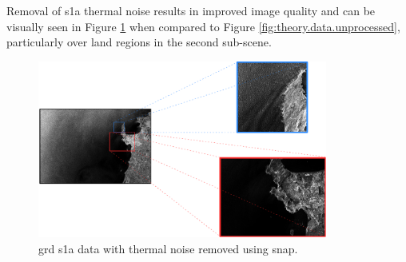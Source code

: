 

Removal of \acs{s1a} thermal noise results in improved image quality and can be visually seen in Figure \ref{fig:theory.data.thermalNoiseRemoval} when compared to Figure \ref{fig:theory.data.unprocessed}, particularly over land regions in the second sub-scene.

\begin{figure}[H]
    \centering
    \includegraphics[width=0.85\textwidth]{Figures/Theory/thermalNoiseCalibratedSARData.pdf}
    \caption{\acs{grd} \acs{s1a} data with thermal noise removed using \acs{snap}.}
    \label{fig:theory.data.thermalNoiseRemoval}
\end{figure}

